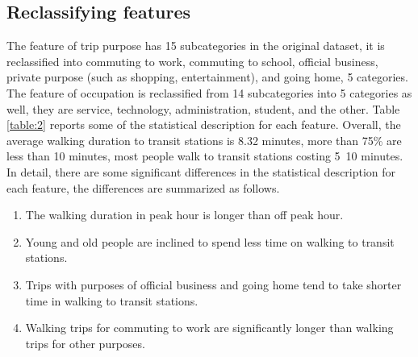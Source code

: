 \documentclass[Journal,letterpaper]{ascelike-new}
\begin{document}
\subsection{Reclassifying features}
The feature of trip purpose has 15 subcategories in the original dataset, it is reclassified into commuting to work, commuting to school, official business, private purpose (such as shopping, entertainment), and going home, 5 categories. The feature of occupation is reclassified from 14 subcategories into 5 categories as well, they are service, technology, administration, student, and the other. Table \ref{table:2} reports some of the statistical description for each feature. Overall, the average walking duration to transit stations is 8.32 minutes, more than 75\% are less than 10 minutes, most people walk to transit stations costing 5~10 minutes. In detail, there are some significant differences in the statistical description for each feature, the differences are summarized as follows.
%
\begin{enumerate}
    \item The walking duration in peak hour is longer than off peak hour.
    \item Young and old people are inclined to spend less time on walking to transit stations.
    \item Trips with purposes of official business and going home tend to take shorter time in walking to transit stations.
    \item Walking trips for commuting to work are significantly longer than walking trips for other purposes.
\end{enumerate}
%
\end{document}
